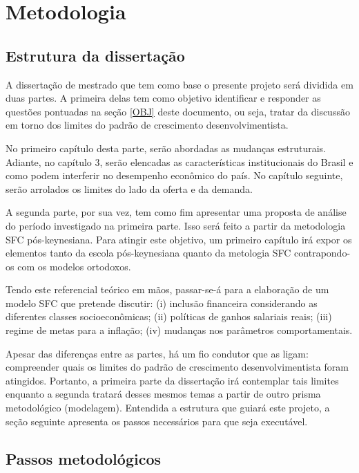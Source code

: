 \documentclass[12pt]{report}
\begin{document}
{\let\clearpage\relax \chapter{Metodologia}\label{Metodo}}




\section{Estrutura da dissertação}

A dissertação de mestrado que tem como base o presente projeto será dividida em duas partes. A primeira delas tem como objetivo identificar e responder as questões pontuadas na seção \ref{OBJ} deste documento, ou seja, tratar da discussão em torno dos limites do padrão de crescimento desenvolvimentista.  

No primeiro capítulo desta parte, serão abordadas as mudanças estruturais. Adiante, no capítulo 3, serão elencadas as características institucionais do Brasil e como podem interferir no desempenho econômico do país. No capítulo seguinte, serão arrolados os limites do lado da oferta e da demanda. 

 A segunda parte, por sua vez, tem como fim apresentar uma proposta de análise do período investigado na primeira parte. Isso será feito a partir da metodologia SFC pós-keynesiana. Para atingir este objetivo, um primeiro capítulo irá expor os elementos tanto da escola pós-keynesiana quanto da metologia SFC contrapondo-os com os modelos ortodoxos. 
 
 Tendo este referencial teórico em mãos, passar-se-á para a elaboração de um modelo SFC que pretende discutir: (i) inclusão financeira considerando as diferentes classes socioeconômicas;  (ii) políticas de ganhos salariais reais; (iii) regime de metas para a inflação; (iv) mudanças nos parâmetros comportamentais.
 
 Apesar das diferenças entre as partes, há um fio condutor que as ligam: compreender quais os limites do padrão de crescimento desenvolvimentista foram atingidos. 
 Portanto, a primeira parte da dissertação irá contemplar tais limites enquanto a segunda tratará desses mesmos temas a partir de outro prisma metodológico (modelagem). Entendida a estrutura que guiará este projeto, a seção seguinte apresenta os passos necessários para que seja executável.
 






\section{Passos metodológicos}\label{passos}
\end{document}
